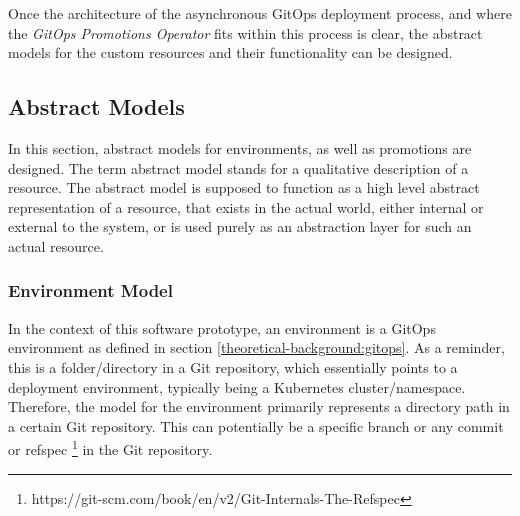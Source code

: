 %
%
%

Once the architecture of the asynchronous GitOps deployment process,
and where the \textit{GitOps Promotions Operator} fits within this process is clear,
the abstract models for the custom resources and their functionality can be designed.






\subsection{Abstract Models}
\label{prototype:design:abstract-models}

In this section,
abstract models for environments, as well as promotions are designed.
The term abstract model stands for a qualitative description of a resource.
The abstract model is supposed to function as a high level abstract representation of a resource,
that exists in the actual world, either internal or external to the system,
or is used purely as an abstraction layer for such an actual resource.

\subsubsection*{Environment Model}

In the context of this software prototype,
an environment is a GitOps environment as defined in section
\ref{theoretical-background:gitops}.
As a reminder, this is a folder/directory in a Git repository,
which essentially points to a deployment environment, typically being a Kubernetes cluster/namespace.
Therefore, the model for the environment primarily represents a directory path in a certain Git repository.
This can potentially be a specific branch or any commit or refspec
\nolinebreak
\footnote{https://git-scm.com/book/en/v2/Git-Internals-The-Refspec}
in the Git repository.

